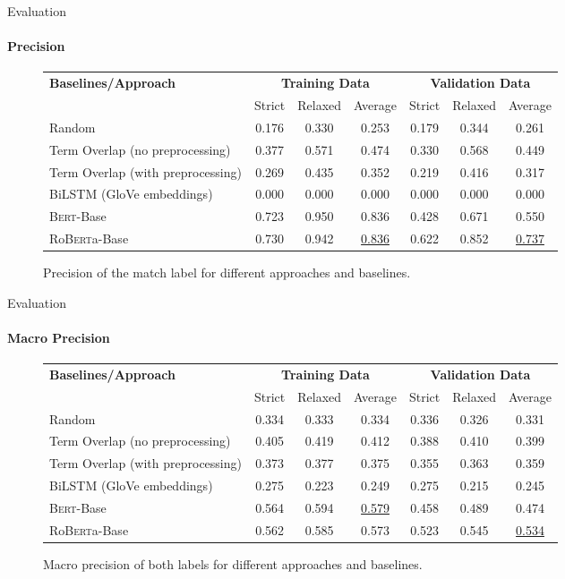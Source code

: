 \documentclass[english,handout]{mlutalk}
\newcommand{\Bert}{\textsc{Bert}\xspace}
\newcommand{\BertBase}{\Bert-Base\xspace}
\newcommand{\Roberta}{\mbox{Ro\textsc{Bert}a}\xspace}
\newcommand{\RobertaBase}{\Roberta-Base\xspace}
\begin{document}
\begin{frame}{Evaluation}
  \framesubtitle{Precision}
  \begin{figure}
    \centering
    \caption{Precision of the match label for different approaches and baselines.}
    \tiny
    \begin{tabular}{lcccccc}
      \toprule
      \textbf{Baselines/Approach} & \multicolumn{3}{c}{\textbf{Training Data}} & \multicolumn{3}{c}{\textbf{Validation Data}}\\
      \cmidrule(r{0.5em}){2-4} \cmidrule(l{0.5em}){5-7}
      & Strict & Relaxed & Average & Strict & Relaxed & Average\\
      \midrule
      Random 
      & 0.176 & 0.330 & 0.253 & 0.179 & 0.344 & 0.261 \\
      Term Overlap (no preprocessing)
      & 0.377 & 0.571 & 0.474 & 0.330 & 0.568 & 0.449 \\
      Term Overlap (with preprocessing)
      & 0.269 & 0.435 & 0.352 & 0.219 & 0.416 & 0.317 \\
      \midrule
      BiLSTM (GloVe embeddings)
      & 0.000 & 0.000 & 0.000 & 0.000 & 0.000 & 0.000 \\
      \BertBase
      & 0.723 & 0.950 & 0.836 & 0.428 & 0.671 & 0.550 \\
      \RobertaBase
      & 0.730 & 0.942 & \underline{0.836} & 0.622 & 0.852 & \underline{0.737} \\
      \bottomrule
    \end{tabular}
  \end{figure}
\end{frame}

\begin{frame}{Evaluation}
  \framesubtitle{Macro Precision}
  \begin{figure}
    \centering
    \caption{Macro precision of both labels for different approaches and baselines.}
    \tiny
    \begin{tabular}{lcccccc}
      \toprule
      \textbf{Baselines/Approach} & \multicolumn{3}{c}{\textbf{Training Data}} & \multicolumn{3}{c}{\textbf{Validation Data}}\\
      \cmidrule(r{0.5em}){2-4} \cmidrule(l{0.5em}){5-7}
      & Strict & Relaxed & Average & Strict & Relaxed & Average\\
      \midrule
      Random 
      & 0.334 & 0.333 & 0.334 & 0.336 & 0.326 & 0.331 \\
      Term Overlap (no preprocessing)
      & 0.405 & 0.419 & 0.412 & 0.388 & 0.410 & 0.399 \\
      Term Overlap (with preprocessing)
      & 0.373 & 0.377 & 0.375 & 0.355 & 0.363 & 0.359 \\
      \midrule
      BiLSTM (GloVe embeddings)
      & 0.275 & 0.223 & 0.249 & 0.275 & 0.215 & 0.245 \\
      \BertBase
      & 0.564 & 0.594 & \underline{0.579} & 0.458 & 0.489 & 0.474 \\
      \RobertaBase
      & 0.562 & 0.585 & 0.573 & 0.523 & 0.545 & \underline{0.534} \\
      \bottomrule
    \end{tabular}
  \end{figure}
\end{frame}
\end{document}
